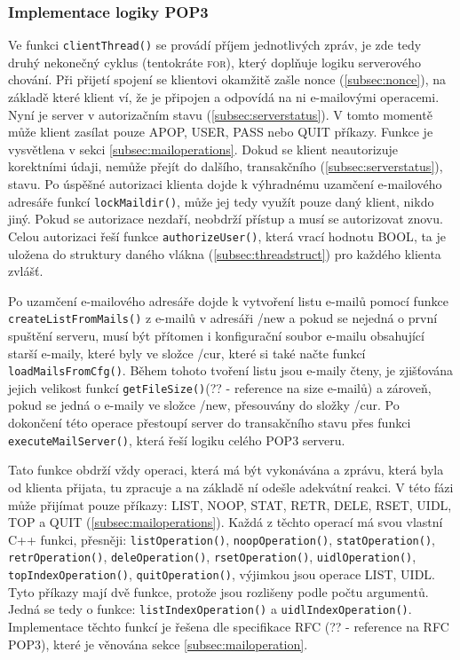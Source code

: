 \documentclass[11pt,a4paper]{report}
\begin{document}
    \subsubsection{Implementace logiky POP3}
    \label{subsec:pop3implementation}
    Ve funkci \texttt{clientThread()} se provádí příjem jednotlivých zpráv, je zde tedy druhý nekonečný cyklus (tentokráte \textsc{for}), který doplňuje logiku serverového chování. Při přijetí spojení se klientovi okamžitě zašle nonce (\ref{subsec:nonce}), na základě které klient ví, že je připojen a odpovídá na ni e-mailovými operacemi. Nyní je server v autorizačním stavu (\ref{subsec:serverstatus}). V tomto momentě může klient zasílat pouze APOP, USER, PASS nebo QUIT příkazy. Funkce je vysvětlena v sekci \ref{subsec:mailoperations}. Dokud se klient neautorizuje korektními údaji, nemůže přejít do dalšího, transakčního (\ref{subsec:serverstatus}), stavu. Po úspěšné autorizaci klienta dojde k výhradnému uzamčení e-mailového adresáře funkcí \texttt{lockMaildir()}, může jej tedy využít pouze daný klient, nikdo jiný. Pokud se autorizace nezdaří, neobdrží přístup a musí se autorizovat znovu. Celou autorizaci řeší funkce \texttt{authorizeUser()}, která vrací hodnotu \textsc{BOOL}, ta je uložena do struktury daného vlákna (\ref{subsec:threadstruct}) pro každého klienta zvlášť. \par
    Po uzamčení e-mailového adresáře dojde k vytvoření listu e-mailů pomocí funkce \texttt{createListFromMails()} z e-mailů v adresáři /new a pokud se nejedná o první spuštění serveru, musí být přítomen i konfigurační soubor e-mailu obsahující starší e-maily, které byly ve složce /cur, které si také načte funkcí \texttt{loadMailsFromCfg()}. Během tohoto tvoření listu jsou e-maily čteny, je zjišťována jejich velikost funkcí \texttt{getFileSize()}(?? - reference na size e-mailů) a zároveň, pokud se jedná o e-maily ve složce /new, přesouvány do složky /cur. Po dokončení této operace přestoupí server do transakčního stavu přes funkci \texttt{executeMailServer()}, která řeší logiku celého POP3 serveru.\par
    Tato funkce obdrží vždy operaci, která má být vykonávána a zprávu, která byla od klienta přijata, tu zpracuje a na základě ní odešle adekvátní reakci. V této fázi může přijímat pouze příkazy: LIST, NOOP, STAT, RETR, DELE, RSET, UIDL, TOP a QUIT (\ref{subsec:mailoperations}). Každá z těchto operací má svou vlastní C++ funkci, přesněji: \texttt{listOperation()}, \texttt{noopOperation()}, \texttt{statOperation()}, \texttt{retrOperation()}, \texttt{deleOperation()}, \texttt{rsetOperation()}, \texttt{uidlOperation()}, \texttt{topIndexOperation()}, \texttt{quitOperation()}, výjimkou jsou operace LIST, UIDL. Tyto příkazy mají dvě funkce, protože jsou rozlišeny podle počtu argumentů. Jedná se tedy o funkce: \texttt{listIndexOperation()} a \texttt{uidlIndexOperation()}. Implementace těchto funkcí je řešena dle specifikace RFC (?? - reference na RFC POP3), které je věnována sekce \ref{subsec:mailoperation}.\par
\end{document}
